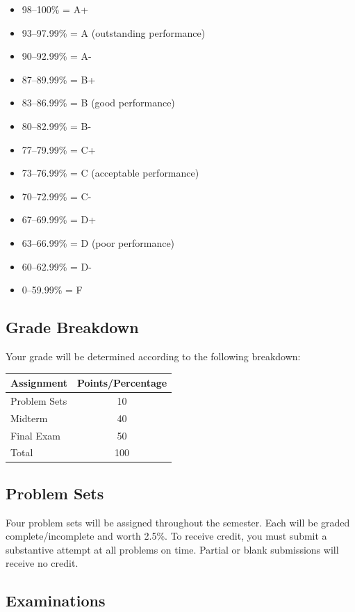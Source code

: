 \documentclass{syllabus}
\begin{document}
{
\begin{itemize}[nosep]
\item[] 98--100\% = A+ 
\item[] 93--97.99\% = A (outstanding performance) 
\item[] 90--92.99\% = A- 
\item[] 87--89.99\% = B+ 
\item[] 83--86.99\% = B (good performance) 
\item[] 80--82.99\% = B- 
\item[] 77--79.99\% = C+ 
\item[] 73--76.99\% = C (acceptable performance) 
\item[] 70--72.99\% = C- 
\item[] 67--69.99\% = D+ 
\item[] 63--66.99\% = D (poor performance) 
\item[] 60--62.99\% = D- 
\item[] 0--59.99\% = F 
\end{itemize}}

\subsection*{Grade Breakdown}

\noindent Your grade will be determined according to the following breakdown: 
\begin{center}
\begin{tabularx}{0.65\textwidth}{Xc}
\hline
  \textbf{Assignment}        & \textbf{Points/Percentage} \\ \hline
Problem Sets & 10 \\
Midterm & 40 \\
Final Exam & 50 \\
\hline
Total & 100 \\
\hline 
\end{tabularx}
\end{center}

\subsection*{Problem Sets}

Four problem sets will be assigned throughout the semester. Each will be graded complete/incomplete and worth 2.5\%. To receive credit, you must submit a substantive attempt at all problems on time. Partial or blank submissions will receive no credit.

\subsection*{Examinations}
\end{document}
